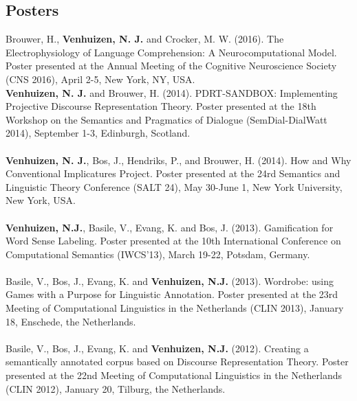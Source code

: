 \documentclass[a4paper,10pt]{article}
\begin{document}
\subsection*{Posters}

\noindent
    Brouwer, H., \textbf{Venhuizen, N. J.} and Crocker, M. W. (2016). The
    Electrophysiology of Language Comprehension: A Neurocomputational Model.
    Poster presented at the Annual Meeting of the Cognitive Neuroscience
    Society (CNS 2016), April 2-5, New York, NY, USA.
    \\
    \textbf{Venhuizen, N. J.} and Brouwer, H. (2014). PDRT-SANDBOX:
    Implementing Projective Discourse Representation Theory. Poster
    presented at the 18th Workshop on the Semantics and Pragmatics of
    Dialogue (SemDial-DialWatt 2014), September 1-3, Edinburgh, Scotland.\\
    \\
    \textbf{Venhuizen, N. J.}, Bos, J., Hendriks, P., and Brouwer, H.
    (2014). How and Why Conventional Implicatures Project. Poster presented
    at the 24rd Semantics and Linguistic Theory Conference (SALT 24), May
    30-June 1, New York University, New York, USA.\\
    \\
    \textbf{Venhuizen, N.J.}, Basile, V., Evang, K. and Bos, J. (2013).
    Gamification for Word Sense Labeling. Poster presented at the 10th
    International Conference on Computational Semantics (IWCS'13), March
    19-22, Potsdam, Germany.\\
    \\
    Basile, V., Bos, J., Evang, K. and \textbf{Venhuizen, N.J.} (2013).
    Wordrobe: using Games with a Purpose for Linguistic Annotation. Poster
    presented at the 23rd Meeting of Computational Linguistics in the
    Netherlands (CLIN 2013), January 18, Enschede, the Netherlands.\\
    \\
    Basile, V., Bos, J., Evang, K. and \textbf{Venhuizen, N.J.} (2012).
    Creating a semantically annotated corpus based on Discourse
    Representation Theory. Poster presented at the 22nd Meeting of
    Computational Linguistics in the Netherlands (CLIN 2012), January 20,
    Tilburg, the Netherlands.


\end{document}
